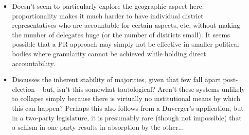 \documentclass[12pt]{article}
\begin{document}
\begin{itemize}
    \item Doesn't seem to particularly explore the geographic aspect here: proportionality makes it much harder to have individual district representatives who are accountable for certain aspects, etc, without making the number of delegates huge (or the number of districts small). It seems possible that a PR approach may simply not be effective in smaller political bodies where granularity cannot be achieved while holding direct accountability.
    \item Discusses the inherent stability of majorities, given that few fall apart post-election -- but, isn't this somewhat tautological? Aren't these systems unlikely to collapse simply because there is virtually no institutional means by which this can happen? Perhaps this also follows from a Duverger's application, but in a two-party legislature, it is presumably rare (though not impossible) that a schism in one party results in absorption by the other...
\end{itemize}
\end{document}
